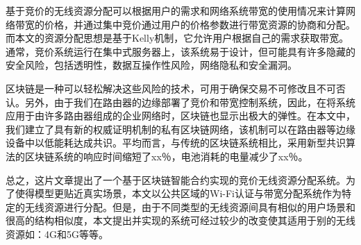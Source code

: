 \begin{cnabstract}
基于竞价的无线资源分配可以根据用户的需求和网络系统带宽的使用情况来计算网络带宽的价格，并通过集中竞价通过用户的价格参数进行带宽资源的协商和分配。而本文的资源分配思想是基于Kelly机制，它允许用户根据自己的需求获取带宽。通常，竞价系统运行在集中式服务器上，该系统易于设计，但可能具有许多隐藏的安全风险，包括透明性，数据互操作性风险，网络隐私和安全漏洞。

区块链是一种可以轻松解决这些风险的技术，可用于确保交易不可修改且不可否认。另外，由于我们在路由器的边缘部署了竞价和带宽控制系统，因此，在将系统应用于由许多路由器组成的企业网络时，区块链也显示出极大的弹性。在本文中，我们建立了具有新的权威证明机制的私有区块链网络，该机制可以在路由器等边缘设备中以低能耗达成共识。平均而言，与传统的区块链系统相比，采用新型共识算法的区块链系统的响应时间缩短了xx％，电池消耗的电量减少了xx％。

总之，这片文章提出了一个基于区块链智能合约实现的竞价无线资源分配系统。为了使得模型更贴近真实场景，本文以公共区域的Wi-Fi认证与带宽分配系统作为特定的无线资源进行分配。但是，由于不同类型的无线资源间具有相似的用户场景和很高的结构相似度，本文提出并实现的系统可经过较少的改变使其适用于别的无线资源如：4G和5G等等。

\end{cnabstract}

